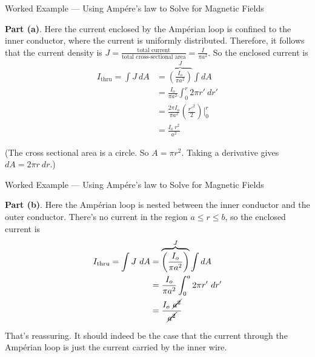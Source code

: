 \documentclass{beamer}
\begin{document}
\begin{frame}{Worked Example --- Using Amp{\'e}re's law to Solve for Magnetic Fields}

\textbf{Part (a)}. Here the current enclosed by the Amp{\'e}rian loop is confined to the inner conductor, where the current is uniformly distributed. Therefore, it follows that the current density is $J = \frac{\text{total current}}{\text{total cross-sectional area}} = \frac{I}{\pi a^2}$. So the enclosed current is
\vspace{-1em}
\begin{align*}
    I_{\text{thru}} = \int J\ dA &= \overbrace{\left( \frac{I_o}{\pi a^2} \right)}^{J} \int dA \\
                                 &= \frac{I_o}{\pi a^2} \int_{0}^{r} 2\pi r'\ dr' \\
                                 &= \frac{2\pi I_o}{\pi a^2} \left( \frac{r'^2}{2} \right) \bigg|_{0}^{r} \\
                                 &= \frac{I_o\ r^2}{a^2}
\end{align*}

(The cross sectional area is a circle. So $A = \pi r^2$. Taking a derivative gives $dA = 2\pi r\ dr$.)

\end{frame}

\begin{frame}{Worked Example --- Using Amp{\'e}re's law to Solve for Magnetic Fields}

\textbf{Part (b)}. Here the Amp{\'e}rian loop is nested between the inner conductor and the outer conductor. There's no current in the region $a \leqslant r \leqslant b$, so the enclosed current is
\begin{align*}
    I_{\text{thru}} = \int J\ dA &= \overbrace{\left( \frac{I_o}{\pi a^2} \right)}^{J} \int dA \\
                                 &= \frac{I_o}{\pi a^2} \int_{0}^{a} 2\pi r'\ dr' \\
                                 &= \frac{I_o\ \cancel{a^2}}{\cancel{a^2}}
\end{align*}

That's reassuring. It should indeed be the case that the current through the Amp{\'e}rian loop is just the current carried by the inner wire.

\end{frame}
\end{document}
